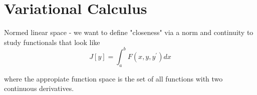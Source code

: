 \chapter{Variational Calculus}

Normed linear space - we want to define "closeness" via a norm and continuity to study functionals that look like
$$
J[y] = \int_{a}^{b} F(x, y, y^\prime) dx
$$

where the appropiate function space is the set of all functions with two continuous derivatives.